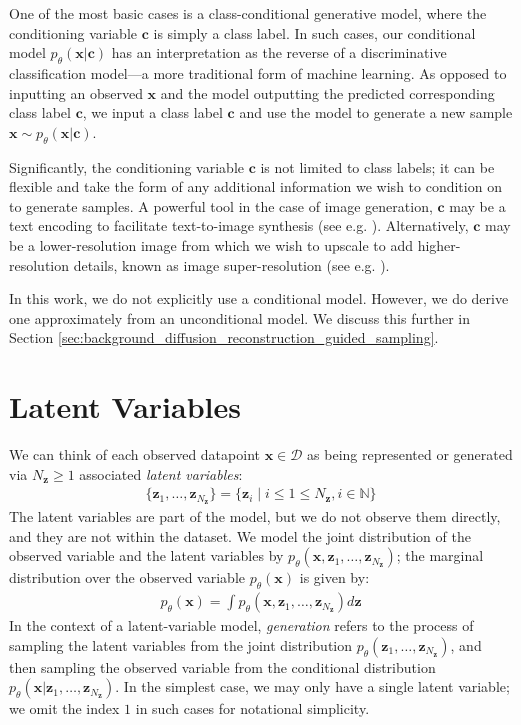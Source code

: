 \documentclass[ oneside,%
                    author={George Herbert},
                    degree={MSci},
                     title={Diffusion Models for Time-Evolving Precipitation Fields},
                  subtitle={}]{dissertation}
\begin{document}
One of the most basic cases is a class-conditional generative model, where the conditioning variable $\mathbf{c}$ is simply a class label. In such cases, our conditional model $p_\theta(\mathbf{x}|\mathbf{c})$ has an interpretation as the reverse of a discriminative classification model---a more traditional form of machine learning. As opposed to inputting an observed $\mathbf{x}$ and the model outputting the predicted corresponding class label $\mathbf{c}$, we input a class label $\mathbf{c}$ and use the model to generate a new sample $\mathbf{x}\sim p_\theta(\mathbf{x}|\mathbf{c})$.

Significantly, the conditioning variable $\mathbf{c}$ is not limited to class labels; it can be flexible and take the form of any additional information we wish to condition on to generate samples. A powerful tool in the case of image generation, $\mathbf{c}$ may be a text encoding to facilitate text-to-image synthesis (see e.g. \cite{Imagen_Saharia,Simple_Diffusion_Hoogeboom}). Alternatively, $\mathbf{c}$ may be a lower-resolution image from which we wish to upscale to add higher-resolution details, known as image super-resolution (see e.g. \cite{Cascaded_Ho}).

In this work, we do not explicitly use a conditional model. However, we do derive one approximately from an unconditional model. We discuss this further in Section \ref{sec:background_diffusion_reconstruction_guided_sampling}.

\section{Latent Variables}
\label{sec:background_latent}

We can think of each observed datapoint $\mathbf{x}\in\mathcal{D}$ as being represented or generated via $N_{\mathbf{z}}\ge 1$ associated \textit{latent variables}:
\begin{align}
      \{\mathbf{z}_1,\ldots,\mathbf{z}_{N_\mathbf{z}}\} = \{\mathbf{z}_i \mid i \le 1 \le N_{\mathbf{z}}, i \in \mathbb{N} \}
\end{align}
The latent variables are part of the model, but we do not observe them directly, and they are not within the dataset. We model the joint distribution of the observed variable and the latent variables by $p_\theta(\mathbf{x},\mathbf{z}_1,\ldots,\mathbf{z}_{N_\mathbf{z}})$; the marginal distribution over the observed variable $p_\theta(\mathbf{x})$ is given by:
\begin{align}
      p_\theta(\mathbf{x})=\int p_\theta(\mathbf{x},\mathbf{z}_1,\ldots,\mathbf{z}_{N_\mathbf{z}}) d\mathbf{z}
\end{align}
In the context of a latent-variable model, \textit{generation} refers to the process of sampling the latent variables from the joint distribution $p_\theta(\mathbf{z}_1,\ldots,\mathbf{z}_{N_\mathbf{z}})$, and then sampling the observed variable from the conditional distribution $p_\theta(\mathbf{x}|\mathbf{z}_1,\ldots,\mathbf{z}_{N_\mathbf{z}})$. In the simplest case, we may only have a single latent variable; we omit the index $1$ in such cases for notational simplicity.
\end{document}
